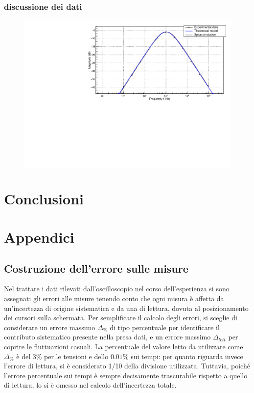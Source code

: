 \documentclass{article}
\begin{document}
\subsubsection{discussione dei dati}


\begin{center}
    \begin{figure}[H]
    \centering
    \includegraphics[scale=0.375, angle=0]{bodeshaper_no_pz.pdf}
    \caption{}
    \label{fig:bodeshaper_no_pz}
    \end{figure}
\end{center}
\section{Conclusioni}


\appendix
\section{Appendici}
\label{appendice}
\subsection{Costruzione dell'errore sulle misure}
\label{Calcerr}

Nel trattare i dati rilevati dall'oscilloscopio nel corso dell'esperienza si sono assegnati gli errori alle misure tenendo conto che ogni misura è affetta da un'incertezza di origine sistematica e da una di lettura, dovuta al posizionamento dei cursori sulla schermata. Per semplificare il calcolo degli errori, si sceglie di considerare un errore massimo $\Delta_{\%}$ di tipo percentuale per identificare il contributo sistematico presente nella presa dati, e un errore massimo $\Delta_{lett}$ per coprire le fluttuazioni casuali. La percentuale del valore letto da utilizzare come $\Delta_{\%}$ è del $3\%$ per le tensioni e dello $0.01\%$ sui tempi: per quanto riguarda invece l'errore di lettura, si è considerato 1/10 della divisione utilizzata.
Tuttavia, poiché l'errore percentuale sui tempi è sempre decisamente trascurabile rispetto a quello di lettura, lo si è omesso nel calcolo dell'incertezza totale.
\end{document}
